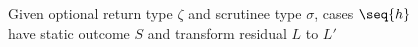 \begin{figure}
\flushleft {}
\begin{mathpar}
\small

\end{mathpar}
\caption{Given optional return type $\zeta$ and scrutinee type $\sigma$, cases $\seq{h}$ have static outcome $S$ and transform residual $L$ to $L'$}
\label{fig:typing-cases}
\end{figure}
